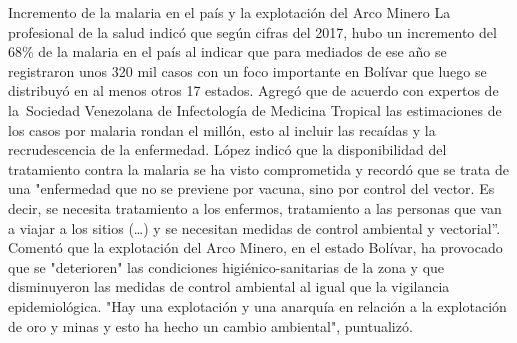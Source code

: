 \documentclass{article}%
\begin{document}
\newline%
%
Incremento de la malaria en el país y la explotación del Arco Minero%
\newline%
%
La profesional de la salud indicó que según cifras del 2017, hubo un incremento del 68\% de la malaria en el país al indicar que para mediados de ese año se registraron unos 320 mil casos con un foco importante en Bolívar que luego se distribuyó en al menos otros 17 estados.%
\newline%
%
Agregó que de acuerdo con expertos de la~Sociedad Venezolana de Infectología de Medicina Tropical las estimaciones de los casos por malaria rondan el millón, esto al incluir las recaídas y la recrudescencia de la enfermedad.%
\newline%
%
López indicó que la disponibilidad del tratamiento contra la malaria se ha visto comprometida y recordó que se trata de una "enfermedad que no se previene por vacuna, sino por control del vector. Es decir, se necesita tratamiento a los enfermos, tratamiento a las personas que van a viajar a los sitios (…) y se necesitan medidas de control ambiental y vectorial”.%
\newline%
%
Comentó que la explotación del Arco Minero, en el estado Bolívar, ha provocado que se "deterioren" las condiciones higiénico{-}sanitarias de la zona y que disminuyeron las medidas de control ambiental al igual que la vigilancia epidemiológica.%
\newline%
%
"Hay una explotación y una anarquía en relación a la explotación de oro y minas y esto ha hecho un cambio ambiental", puntualizó.%
\newline%
%
\end{document}
